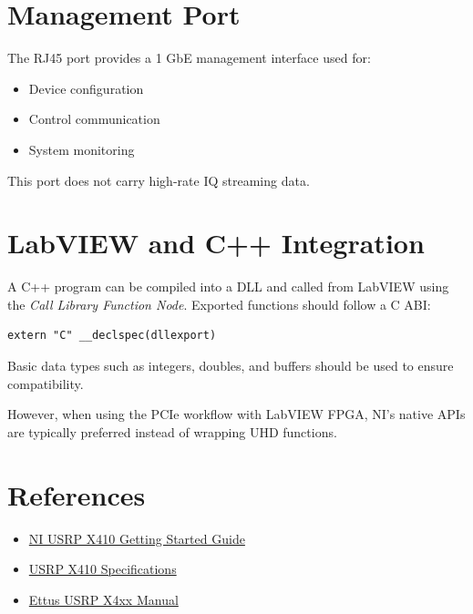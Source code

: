 \documentclass[12pt]{article}
\begin{document}
\section{Management Port}

The RJ45 port provides a 1 GbE management interface used for:

\begin{itemize}
\item Device configuration
\item Control communication
\item System monitoring
\end{itemize}

This port does not carry high-rate IQ streaming data.

\section{LabVIEW and C++ Integration}

A C++ program can be compiled into a DLL and called from LabVIEW using the
\textit{Call Library Function Node}. Exported functions should follow a C ABI:

\begin{verbatim}
extern "C" __declspec(dllexport)
\end{verbatim}

Basic data types such as integers, doubles, and buffers should be used
to ensure compatibility.

However, when using the PCIe workflow with LabVIEW FPGA, NI's native
APIs are typically preferred instead of wrapping UHD functions.

\section{References}

\begin{itemize}
\item \href{https://www.ni.com/docs/en-BS/bundle/usrp-x410-getting-started/page/getting-started.html}{NI USRP X410 Getting Started Guide}
\item \href{https://www.ni.com/docs/en-DM/bundle/ettus-usrp-x410-specs/page/specs.html}{USRP X410 Specifications}
\item \href{https://files.ettus.com/manual/page_usrp_x4xx.html}{Ettus USRP X4xx Manual}
\end{itemize}
\end{document}
